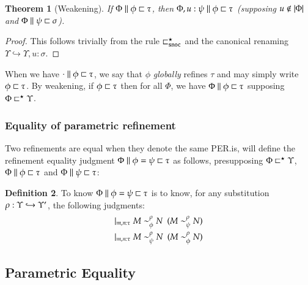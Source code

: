\documentclass[11pt]{article}
\newtheorem{thm}{Theorem}[section]
\theoremstyle{definition}
\newtheorem{definition}[thm]{Definition}
\theoremstyle{remark}
\numberwithin{equation}{section}
\def\IModeColorName{MidnightBlue}
\def\OModeColorName{Maroon}
\def\IModeColorName{Black}
\def\OModeColorName{Black}
\newcommand\IMode[1]{{\color{\IModeColorName}{#1}}}
\newcommand\OMode[1]{{\color{\OModeColorName}{#1}}}
\newcommand\HypJ[2]{#1\ \ (#2)}
\newcommand\GenJ[2]{\vert_{\IMode{#1}}\; #2}
\newcommand\Of[2]{\IMode{#1}: \IMode{#2}}
\newcommand\IsAbtUnmoded[5]{
  #1\triangleright%
  #2\parallel%
  #3\vdash%
  #4:\OMode{#5}%
}
\newcommand\IsAbt[5]{\IsAbtUnmoded{\IMode{#1}}{\IMode{#2}}{\IMode{#3}}{\IMode{#4}}{\OMode{#5}}}
\newcommand\MV[1]{\mathfrak{#1}}
\newcommand\Dom[1]{\left\vert#1\right\vert}
\newcommand\NotIn[2]{\IMode{#1}\notin\IMode{#2}}
\newcommand\Refines[3]{\IMode{#1}\parallel\IMode{#2}\sqsubset\OMode{#3}}
\newcommand\GRefines[2]{\IMode{#1}\sqsubset\OMode{#2}}
\newcommand\RefinesCtx[2]{\IMode{#1}\sqsubset^\star\OMode{#2}}
\newcommand\EqRefines[4]{\IMode{#1}\parallel\IMode{#2}=\IMode{#3}\sqsubset\OMode{#4}}
\begin{document}
\begin{thm}[Weakening]
  If $\Refines{\Phi}{\phi}{\tau}$, then $\Refines{\Phi,u:\psi}{\phi}{\tau}$ (supposing
  $\NotIn{u}{\Dom\Phi}$ and $\Refines{\Phi}{\psi}{\sigma}$).
\end{thm}
\begin{proof}
  This follows trivially from the rule $\sqsubset^\star_{\mathtt{snoc}}$ and the canonical renaming
  $\Upsilon\hookrightarrow\Upsilon,u:\sigma$.
\end{proof}

When we have $\Refines{\cdot}{\phi}{\tau}$, we say that $\phi$ \emph{globally}
refines $\tau$ and may simply write $\GRefines{\phi}{\tau}$. By weakening, if
$\GRefines{\phi}{\tau}$ then for all $\Phi$, we have
$\Refines{\Phi}{\phi}{\tau}$ supposing $\RefinesCtx{\Phi}{\Upsilon}$.

\subsubsection{Equality of parametric refinement}

Two refinements are equal when they denote the same PER.\@That is, will define
the refinement equality judgment $\EqRefines{\Phi}{\phi}{\psi}{\tau}$ as
follows, presupposing $\RefinesCtx{\Phi}{\Upsilon}$,
$\Refines{\Phi}{\phi}{\tau}$ and $\Refines{\Phi}{\psi}{\tau}$:
\begin{definition}
  To know $\EqRefines{\Phi}{\phi}{\psi}{\tau}$ is to know, for any substitution
  $\Of{\rho}{\Upsilon\hookrightarrow\OMode{\Upsilon'}}$, the following judgments:
  \begin{gather*}
    \GenJ{
      \MV{m},\MV{n}:\tau
    }{
      \HypJ{
        \IMode{M}\sim^\rho_\phi\IMode{N}
      }{
        \IMode{M}\sim^\rho_\psi\IMode{N}
      }
    }\\
    \GenJ{
      \MV{m},\MV{n}:\tau
    }{
      \HypJ{
        \IMode{M}\sim^\rho_\psi\IMode{N}
      }{
        \IMode{M}\sim^\rho_\phi\IMode{N}
      }
    }
  \end{gather*}

\end{definition}

\subsection{Parametric Equality}
\end{document}
